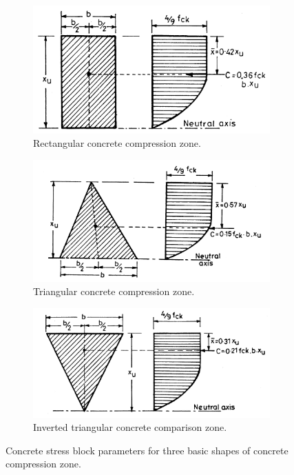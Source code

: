 \begin{figure}
\centering
\begin{subfigure}{0.5\textwidth}
\includegraphics[width=\textwidth]{images/rectangular.png}
\caption{Rectangular concrete compression zone.}
\label{fig:rectangular}
\end{subfigure}
%
\begin{subfigure}{0.5\textwidth}
\centering
\includegraphics[width=\textwidth]{images/triangular.png}
\caption{Triangular concrete compression zone.}
\label{fig:triangular}
\end{subfigure}
%
\begin{subfigure}{0.5\textwidth}
\centering
\includegraphics[width=\textwidth]{images/inverted.png}
\caption{Inverted triangular concrete comparison zone.}
\label{fig:inverted}
\end{subfigure}
\caption{Concrete stress block parameters for three basic shapes of concrete compression zone.}
\label{fig:concrete}
\end{figure}

